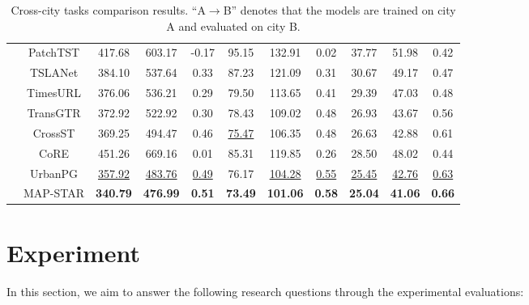 \begin{table}[htbp]
\begin{tabular}{c|c|ccc|ccc|ccc}
 & PatchTST         & 417.68      & 603.17      & -0.17   & 95.15      & 132.91      & 0.02   & 37.77      & 51.98      & 0.42\\
 & TSLANet                & 384.10      & 537.64      & 0.33   & 87.23      & 121.09      & 0.31   & 30.67      & 49.17      & 0.47\\
 & TimesURL                & 376.06      & 536.21      & 0.29   & 79.50      & 113.65      & 0.41   & 29.39      & 47.03      & 0.48\\ \cmidrule(lr){2-11}
 & TransGTR             & 372.92      & 522.92      & 0.30   & 78.43      & 109.02      & 0.48   & 26.93      & 43.67      & 0.56\\
 & CrossST                 & 369.25      & 494.47      & 0.46   & \underline{75.47}      & 106.35      & 0.48   & 26.63      & 42.88      & 0.61\\
 & CoRE                 & 451.26      & 669.16      & 0.01   & 85.31      & 119.85      & 0.26   & 28.50      & 48.02      & 0.44\\
  & UrbanPG             & \underline{357.92}      & \underline{483.76}      & \underline{0.49}   & 76.17      & \underline{104.28}      & \underline{0.55}   & \underline{25.45}      & \underline{42.76}      & \underline{0.63}\\ \cmidrule(lr){2-11}
 & MAP-STAR     & \textbf{340.79}  & \textbf{476.99}  &  \textbf{0.51}  & \textbf{73.49}  & \textbf{101.06} & \textbf{0.58} & \textbf{25.04}   & \textbf{41.06}   & \textbf{0.66}\\
\bottomrule
\end{tabular}
\caption{
Cross-city tasks comparison results. “A$\rightarrow$B” denotes that the models are trained on city A and evaluated on city B.
}
\label{tab:cross_city}
\end{table}

\section{Experiment}

In this section, we aim to answer the following research questions through the experimental evaluations:

